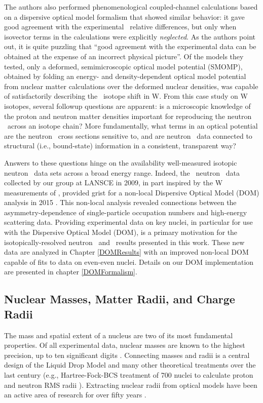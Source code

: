 The authors also performed phenomenological coupled-channel calculations
based on a dispersive optical model formalism
\cite{Mahaux1991} that showed similar behavior: it gave good agreement with the
experimental \tot\ relative differences, but only when isovector terms in the calculations
were explicitly \textit{neglected}. As the
authors point out, it is quite puzzling that ``good agreement with the
experimental data can be obtained at the expense of an incorrect physical
picture''.
Of the models they tested, only a deformed, semimicroscopic
optical model potential (SMOMP),
obtained by folding an energy- and density-dependent optical model potential from nuclear matter 
calculations over the deformed nuclear densities, was capable of satisfactorily describing the
\tot\ isotope shift in W. From this case study on W isotopes, several followup questions
are apparent: is a microscopic knowledge of the proton and neutron matter
densities important for reproducing the neutron \tot\ across an isotope
chain? More fundamentally, what terms in an optical potential are the neutron
\tot\ cross sections sensitive to, and are neutron \tot\ data connected to
structural (i.e., bound-state) information in a consistent, transparent way?

Answers to these questions hinge on the availability well-measured 
isotopic neutron \tot\ data sets across a broad energy range. Indeed, the
\caAughtEight\ neutron \tot\ data collected by our group at LANSCE in 2009, in
part inspired by the W measurements of \cite{Dietrich2003},
provided grist for a non-local Dispersive Optical Model (DOM) analysis in 2015
\cite{MahzoonPhDThesis}. This non-local analysis revealed connections
between the asymmetry-dependence of single-particle occupation numbers
and high-energy scattering data.
Providing experimental data on key nuclei, in particular for use with the Dispersive Optical Model
(DOM), is a primary motivation for the isotopically-resolved neutron \tot\ and \el\
results presented in this work. These new data are analyzed in Chapter \ref{DOMResults} 
with an improved non-local DOM capable of fits to data on even-even nuclei. Details on our DOM
implementation are presented in chapter \ref{DOMFormalism}. 

\subsection{Nuclear Masses, Matter Radii, and Charge Radii}
The mass and spatial extent of a nucleus are two of its most fundamental
properties. Of all experimental data, nuclear masses are known to the highest
precision, up to ten significant digits \cite{AME2016}. Connecting masses and
radii is a central design of the Liquid Drop Model and many other theoretical
treatments over the last century (e.g., Hartree-Fock-BCS treatment of 700 nuclei to calculate 
proton and neutron RMS radii \cite{Angeli1980}). Extracting nuclear radii from optical
models have been an active area of research for over fifty years \cite{Jackson1974}.

